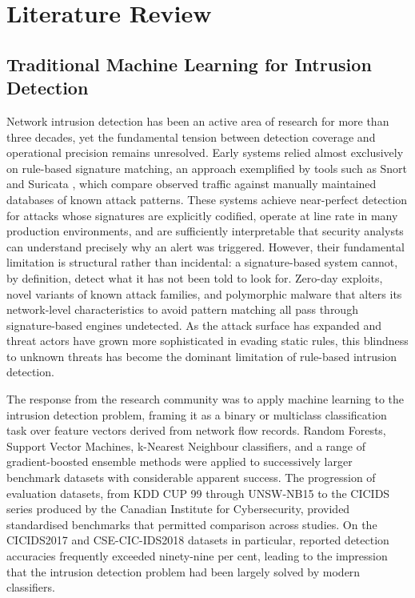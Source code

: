 \documentclass[../main.tex]{subfiles}
\begin{document}
\chapter{Literature Review}
\label{ch:litreview}

\section{Traditional Machine Learning for Intrusion Detection}
\label{sec:traditional-ml-ids}

Network intrusion detection has been an active area of research for more than three decades, yet the fundamental tension between detection coverage and operational precision remains unresolved. Early systems relied almost exclusively on rule-based signature matching, an approach exemplified by tools such as Snort \autocite{Roesch1999} and Suricata \autocite{OISF2010}, which compare observed traffic against manually maintained databases of known attack patterns. These systems achieve near-perfect detection for attacks whose signatures are explicitly codified, operate at line rate in many production environments, and are sufficiently interpretable that security analysts can understand precisely why an alert was triggered. However, their fundamental limitation is structural rather than incidental: a signature-based system cannot, by definition, detect what it has not been told to look for. Zero-day exploits, novel variants of known attack families, and polymorphic malware that alters its network-level characteristics to avoid pattern matching all pass through signature-based engines undetected. As the attack surface has expanded and threat actors have grown more sophisticated in evading static rules, this blindness to unknown threats has become the dominant limitation of rule-based intrusion detection.

The response from the research community was to apply machine learning to the intrusion detection problem, framing it as a binary or multiclass classification task over feature vectors derived from network flow records. Random Forests, Support Vector Machines, k-Nearest Neighbour classifiers, and a range of gradient-boosted ensemble methods were applied to successively larger benchmark datasets with considerable apparent success. The progression of evaluation datasets, from KDD CUP 99 through UNSW-NB15 to the CICIDS series produced by the Canadian Institute for Cybersecurity, provided standardised benchmarks that permitted comparison across studies. On the CICIDS2017 and CSE-CIC-IDS2018 datasets in particular, reported detection accuracies frequently exceeded ninety-nine per cent, leading to the impression that the intrusion detection problem had been largely solved by modern classifiers.
\end{document}
